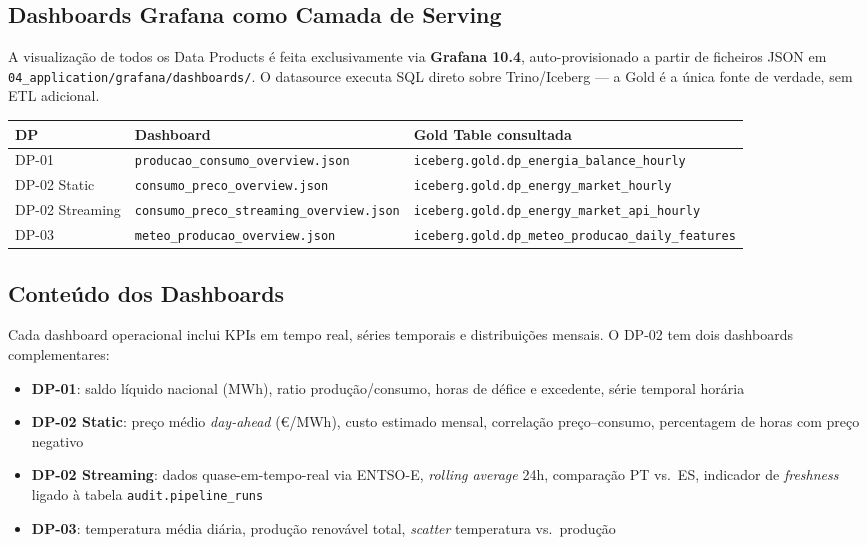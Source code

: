 \documentclass[11pt,a4paper]{article}
\begin{document}
\subsection{Dashboards Grafana como Camada de Serving}

A visualização de todos os Data Products é feita exclusivamente via \textbf{Grafana 10.4}, auto-provisionado a partir de ficheiros JSON em \texttt{04\_application/grafana/dashboards/}. O datasource executa SQL direto sobre Trino/Iceberg --- a Gold é a única fonte de verdade, sem ETL adicional.

\begin{table}[h!]
\centering
\begin{tabularx}{\linewidth}{llX}
\toprule
\textbf{DP} & \textbf{Dashboard} & \textbf{Gold Table consultada} \\
\midrule
DP-01 & \texttt{producao\_consumo\_overview.json} & \texttt{iceberg.gold.dp\_energia\_balance\_hourly} \\
DP-02 Static & \texttt{consumo\_preco\_overview.json} & \texttt{iceberg.gold.dp\_energy\_market\_hourly} \\
DP-02 Streaming & \texttt{consumo\_preco\_streaming\_overview.json} & \texttt{iceberg.gold.dp\_energy\_market\_api\_hourly} \\
DP-03 & \texttt{meteo\_producao\_overview.json} & \texttt{iceberg.gold.dp\_meteo\_producao\_daily\_features} \\
\bottomrule
\end{tabularx}
\end{table}

\subsection{Conteúdo dos Dashboards}

Cada dashboard operacional inclui KPIs em tempo real, séries temporais e distribuições mensais. O DP-02 tem dois dashboards complementares:

\begin{itemize}[leftmargin=*,noitemsep]
  \item \textbf{DP-01}: saldo líquido nacional (MWh), ratio produção/consumo, horas de défice e excedente, série temporal horária
  \item \textbf{DP-02 Static}: preço médio \textit{day-ahead} (€/MWh), custo estimado mensal, correlação preço--consumo, percentagem de horas com preço negativo
  \item \textbf{DP-02 Streaming}: dados quase-em-tempo-real via ENTSO-E, \textit{rolling average} 24h, comparação PT vs.\ ES, indicador de \textit{freshness} ligado à tabela \texttt{audit.pipeline\_runs}
  \item \textbf{DP-03}: temperatura média diária, produção renovável total, \textit{scatter} temperatura vs.\ produção
\end{itemize}
\end{document}

